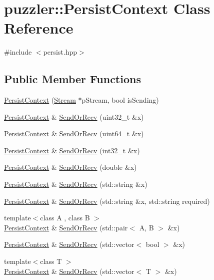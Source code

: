 \hypertarget{a00025}{}\section{puzzler\+:\+:Persist\+Context Class Reference}
\label{a00025}


{\ttfamily \#include $<$persist.\+hpp$>$}

\subsection*{Public Member Functions}
\begin{DoxyCompactItemize}
\item 
\hyperlink{a00025_a32084b3a0b6961fb4c7ed8adccff98c6}{Persist\+Context} (\hyperlink{a00031}{Stream} $\ast$p\+Stream, bool is\+Sending)
\item 
\hyperlink{a00025}{Persist\+Context} \& \hyperlink{a00025_a6dff69ce0bd12a3facf21e283148a43c}{Send\+Or\+Recv} (uint32\+\_\+t \&x)
\item 
\hyperlink{a00025}{Persist\+Context} \& \hyperlink{a00025_abca06a29b81bfc90d55160e8dfd0fa14}{Send\+Or\+Recv} (uint64\+\_\+t \&x)
\item 
\hyperlink{a00025}{Persist\+Context} \& \hyperlink{a00025_a30f9b103b2d5a57febafb200c8ef033c}{Send\+Or\+Recv} (int32\+\_\+t \&x)
\item 
\hyperlink{a00025}{Persist\+Context} \& \hyperlink{a00025_a52e8a321f8315e080a8f6f565e7909cd}{Send\+Or\+Recv} (double \&x)
\item 
\hyperlink{a00025}{Persist\+Context} \& \hyperlink{a00025_aaafef6724ccf8c171d4b2d5db9fe0b9f}{Send\+Or\+Recv} (std\+::string \&x)
\item 
\hyperlink{a00025}{Persist\+Context} \& \hyperlink{a00025_a6269eb2e6e85774332665d6717306d3f}{Send\+Or\+Recv} (std\+::string \&x, std\+::string required)
\item 
{\footnotesize template$<$class A , class B $>$ }\\\hyperlink{a00025}{Persist\+Context} \& \hyperlink{a00025_a5ed1a4b6d55e30f84be3d22bae188e6e}{Send\+Or\+Recv} (std\+::pair$<$ A, B $>$ \&x)
\item 
\hyperlink{a00025}{Persist\+Context} \& \hyperlink{a00025_a7da96872f06e9e8224534d00356e7c3a}{Send\+Or\+Recv} (std\+::vector$<$ bool $>$ \&x)
\item 
{\footnotesize template$<$class T $>$ }\\\hyperlink{a00025}{Persist\+Context} \& \hyperlink{a00025_a7375809a4a1cd1b3f2a81d5a8ba62afb}{Send\+Or\+Recv} (std\+::vector$<$ T $>$ \&x)
\end{DoxyCompactItemize}


